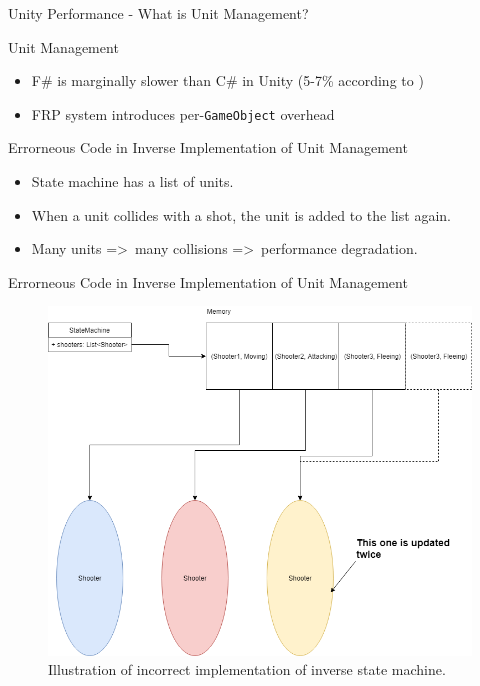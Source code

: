 \begin{frame}{\secname}{\subsecname}
	Unity Performance - What is Unit Management?
\end{frame}

\begin{frame}{\secname}{\subsecname}
	Unit Management
	\begin{itemize}
		\item<2-> F\# is marginally slower than C\# in Unity (5-7\% according to \cite{maggiore2012formal,bolhuis2019gameplay})
		\item<3-> FRP system introduces per-\texttt{GameObject} overhead
	\end{itemize}
\end{frame}

\begin{frame}{\secname}{\subsecname}
	Errorneous Code in Inverse Implementation of Unit Management
	\begin{itemize}
		\item<1-> State machine has a list of units.
		\item<2-> When a unit collides with a shot, the unit is added to the list again.
		\item<3-> Many units =\textgreater\ many collisions =\textgreater\ performance degradation.
	\end{itemize}
\end{frame}

\begin{frame}{\secname}{\subsecname}
	Errorneous Code in Inverse Implementation of Unit Management
	\begin{figure}[h!]
		\centering
		\includegraphics[width=.7\textwidth]{pictures/statemachine.png}
		\caption{Illustration of incorrect implementation of inverse state machine.}
		\label{fig:incorrect:statemachine}
	\end{figure}
\end{frame}

